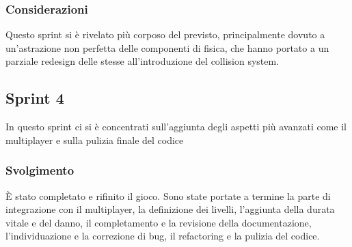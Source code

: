 \subsubsection{Considerazioni}
Questo sprint si è rivelato più corposo del previsto, principalmente dovuto a un'astrazione non perfetta delle componenti di fisica, che hanno portato a un parziale redesign delle stesse all'introduzione del collision system.
\subsection{Sprint 4}
In questo sprint ci si è concentrati sull'aggiunta degli aspetti più avanzati come il multiplayer e sulla pulizia finale del codice
\subsubsection{Svolgimento}
È stato completato e rifinito il gioco. Sono state portate a termine la parte di integrazione con il multiplayer, la definizione dei livelli, l'aggiunta della durata vitale e del danno, il completamento e la revisione della documentazione, l'individuazione e la correzione di bug, il refactoring e la pulizia del codice. 
